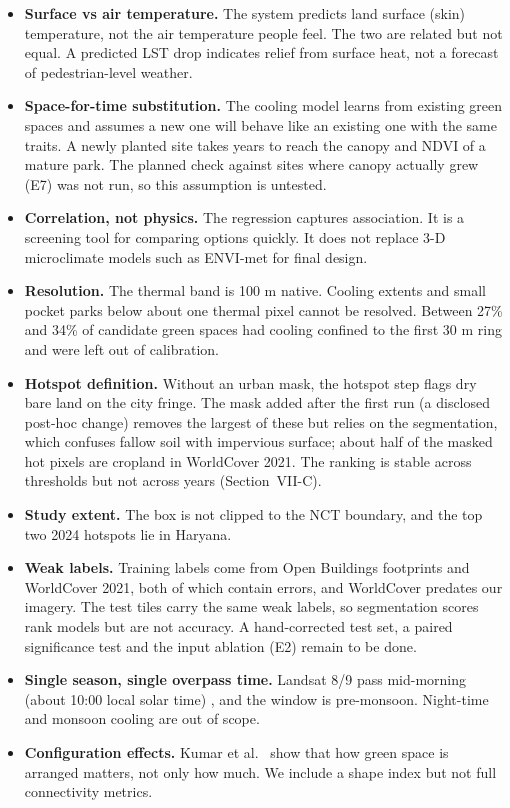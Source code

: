\documentclass[conference]{IEEEtran}
\providecommand{\tightlist}{\setlength{\itemsep}{0pt}\setlength{\parskip}{0pt}}
\begin{document}
\begin{itemize}
\tightlist
\item
  \textbf{Surface vs air temperature.} The system predicts land surface
  (skin) temperature, not the air temperature people feel. The two are
  related but not equal. A predicted LST drop indicates relief from
  surface heat, not a forecast of pedestrian-level weather.
\item
  \textbf{Space-for-time substitution.} The cooling model learns from
  existing green spaces and assumes a new one will behave like an
  existing one with the same traits. A newly planted site takes years to
  reach the canopy and NDVI of a mature park. The planned check against
  sites where canopy actually grew (E7) was not run, so this assumption
  is untested.
\item
  \textbf{Correlation, not physics.} The regression captures
  association. It is a screening tool for comparing options quickly. It
  does not replace 3-D microclimate models such as ENVI-met for final
  design.
\item
  \textbf{Resolution.} The thermal band is 100 m native. Cooling extents
  and small pocket parks below about one thermal pixel cannot be
  resolved. Between 27\% and 34\% of candidate green spaces had cooling
  confined to the first 30 m ring and were left out of calibration.
\item
  \textbf{Hotspot definition.} Without an urban mask, the hotspot step
  flags dry bare land on the city fringe. The mask added after the first
  run (a disclosed post-hoc change) removes the largest of these but
  relies on the segmentation, which confuses fallow soil with impervious
  surface; about half of the masked hot pixels are cropland in
  WorldCover 2021. The ranking is stable across thresholds but not
  across years (Section~VII-C).
\item
  \textbf{Study extent.} The box is not clipped to the NCT boundary, and
  the top two 2024 hotspots lie in Haryana.
\item
  \textbf{Weak labels.} Training labels come from Open Buildings
  footprints and WorldCover 2021, both of which contain errors, and
  WorldCover predates our imagery. The test tiles carry the same weak
  labels, so segmentation scores rank models but are not accuracy. A
  hand-corrected test set, a paired significance test and the input
  ablation (E2) remain to be done.
\item
  \textbf{Single season, single overpass time.} Landsat 8/9 pass
  mid-morning (about 10:00 local solar time) \cite{b22}, and the window
  is pre-monsoon. Night-time and monsoon cooling are out of scope.
\item
  \textbf{Configuration effects.} Kumar et al.~\cite{b4} show that how
  green space is arranged matters, not only how much. We include a shape
  index but not full connectivity metrics.
\end{itemize}
\end{document}
